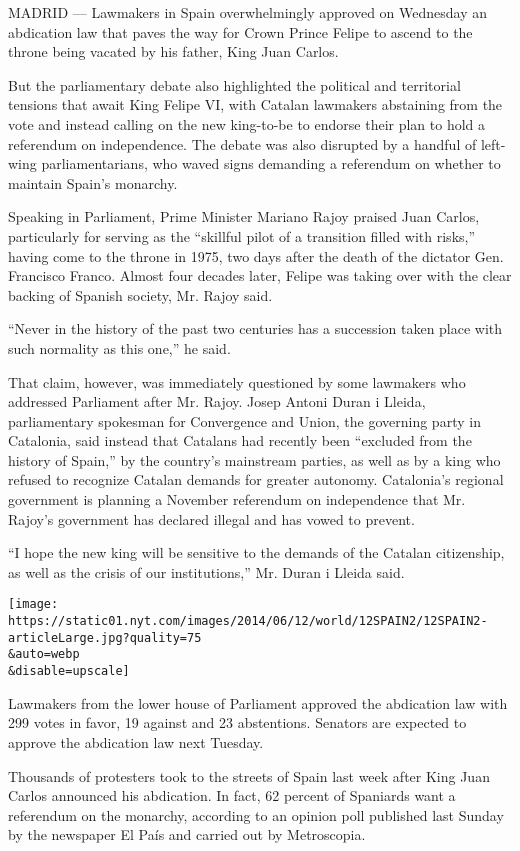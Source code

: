 MADRID --- Lawmakers in Spain overwhelmingly approved on Wednesday an
abdication law that paves the way for Crown Prince Felipe to ascend to
the throne being vacated by his father, King Juan Carlos.

But the parliamentary debate also highlighted the political and
territorial tensions that await King Felipe VI, with Catalan lawmakers
abstaining from the vote and instead calling on the new king-to-be to
endorse their plan to hold a referendum on independence. The debate was
also disrupted by a handful of left-wing parliamentarians, who waved
signs demanding a referendum on whether to maintain Spain's monarchy.

Speaking in Parliament, Prime Minister Mariano Rajoy praised Juan
Carlos, particularly for serving as the ``skillful pilot of a transition
filled with risks,'' having come to the throne in 1975, two days after
the death of the dictator Gen. Francisco Franco. Almost four decades
later, Felipe was taking over with the clear backing of Spanish society,
Mr. Rajoy said.

``Never in the history of the past two centuries has a succession taken
place with such normality as this one,'' he said.

That claim, however, was immediately questioned by some lawmakers who
addressed Parliament after Mr. Rajoy. Josep Antoni Duran i Lleida,
parliamentary spokesman for Convergence and Union, the governing party
in Catalonia, said instead that Catalans had recently been ``excluded
from the history of Spain,'' by the country's mainstream parties, as
well as by a king who refused to recognize Catalan demands for greater
autonomy. Catalonia's regional government is planning a November
referendum on independence that Mr. Rajoy's government has declared
illegal and has vowed to prevent.

``I hope the new king will be sensitive to the demands of the Catalan
citizenship, as well as the crisis of our institutions,'' Mr. Duran i
Lleida said.

\texttt{[image: https://static01.nyt.com/images/2014/06/12/world/12SPAIN2/12SPAIN2-articleLarge.jpg?quality=75\\\&auto=webp\\\&disable=upscale]}

Lawmakers from the lower house of Parliament approved the abdication law
with 299 votes in favor, 19 against and 23 abstentions. Senators are
expected to approve the abdication law next Tuesday.

Thousands of protesters took to the streets of Spain last week after
King Juan Carlos announced his abdication. In fact, 62 percent of
Spaniards want a referendum on the monarchy, according to an opinion
poll published last Sunday by the newspaper El País and carried out by
Metroscopia.

